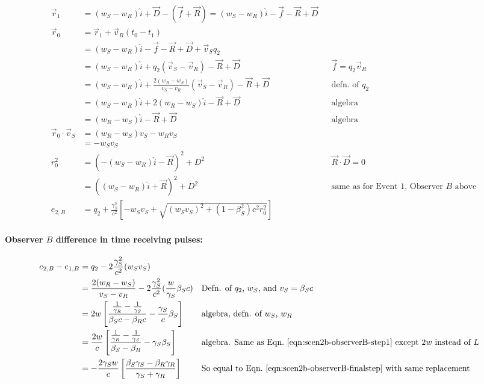 \documentclass[a4paper]{article}
\theoremstyle{plain}
\theoremstyle{definition}
\newcommand{\vect}[1]{\vec{#1}}
\newcommand{\hatvec}[1]{\hat{#1}}
\newcommand{\ihat}{\hatvec{i}}
\begin{document}
\begin{align*}
\vect{r}_1 & = (w_S - w_R)\ihat + \vect{D} - (\vect{f} + \vect{R}) = (w_S - w_R)\ihat - \vect{f} - \vect{R} + \vect{D} \\
\vect{r}_0
  & = \vect{r}_1 + \vect{v}_R (t_0 - t_1) \\
  & = (w_S - w_R)\ihat - \vect{f} - \vect{R} + \vect{D} + \vect{v}_S q_2 \\
  & = (w_S - w_R)\ihat + q_2 (\vect{v}_S - \vect{v}_R) - \vect{R} + \vect{D} & & \text{$\vect{f} = q_2 \vect{v}_R$} \\
  & = (w_S - w_R)\ihat + \frac{2(w_R - w_S)}{v_S - v_R} (\vect{v}_S - \vect{v}_R) - \vect{R} + \vect{D} & & \text{defn. of $q_2$} \\
  & = (w_S - w_R)\ihat + 2(w_R - w_S) \ihat - \vect{R} + \vect{D} & & \text{algebra} \\
  & = (w_R - w_S) \ihat - \vect{R} + \vect{D} & & \text{algebra} \\
\vect{r}_0 \cdot \vect{v}_S
  & = (w_R - w_S)v_S - w_Rv_S \\
  & = - w_Sv_S \\
r_0^2
  & = (-(w_S-w_R)\ihat - \vect{R})^2 + D^2 & & \text{$\vect{R} \cdot \vect{D} = 0$} \\
  & = ((w_S-w_R)\ihat + \vect{R})^2 + D^2 & & \text{same as for Event 1, Observer $B$ above} \\
e_{2,B} & = q_2 + \frac{\gamma_S^2}{c^2} \left[ -w_Sv_S + \sqrt{ (w_Sv_S)^2 + (1-\beta_S^2)c^2r_0^2 } \right]
\end{align*}


\paragraph{Observer $B$ difference in time receiving pulses:}

\begin{align*}
e_{2,B} - e_{1,B}
  & = q_2 - 2\frac{\gamma_S^2}{c^2} (w_S v_S) \\
  & = \frac{2(w_R-w_S)}{v_S - v_R} - 2\frac{\gamma_S^2}{c^2} ( \frac{w}{\gamma_S} \beta_S c ) & & \text{Defn. of $q_2$, $w_S$, and $v_S = \beta_S c$} \\
  & = 2w \left[ \frac{\frac{1}{\gamma_R} - \frac{1}{\gamma_S}}{\beta_S c - \beta_R c} - \frac{\gamma_S}{c} \beta_S \right] & & \text{algebra, defn. of $w_S$, $w_R$} \\
  & = \frac{2w}{c} \left[ \frac{\frac{1}{\gamma_R} - \frac{1}{\gamma_S}}{\beta_S-\beta_R} - \gamma_S \beta_S \right] & & \text{algebra. Same as Eqn.~\eqref{eqn:scen2b-observerB-step1} except $2w$ instead of $L$} \\
  & = -\frac{2\gamma_S w}{c} \left[ \frac{\beta_S\gamma_S - \beta_R\gamma_R}{\gamma_S + \gamma_R} \right] & & \text{So equal to Eqn.~\eqref{eqn:scen2b-observerB-finalstep} with same replacement}
\end{align*}
\end{document}
